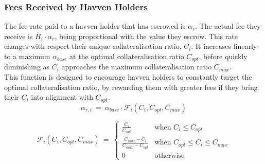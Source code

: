 \subsubsection{Fees Received by Havven Holders}

\noindent The fee rate paid to a havven holder that has escrowed is $\alpha_r$.
The actual fee they receive is $\check{H_i} \cdot \alpha_r$, being proportional with the value they escrow.
This rate changes with respect their unique collateralisation ratio, $C_i$. It increases linearly to a maximum $\alpha_{base}$ at the optimal collateralisation ratio $C_{opt}$, before quickly
diminishing as $C_i$ approaches the maximum collateralisation ratio $C_{max}$.  \\

\noindent This function is designed to encourage havven holders to constantly
target the optimal collateralisation ratio, by rewarding them with greater
fees if they bring their $C_i$ into alignment with $C_{opt}$.\\


\begin{equation}
\alpha_{r,i} \ = \ \alpha_{base} \cdot \mathcal{F}_{i}(C_{i}, C_{opt}, C_{max})  \label{eq:feesreceived}
\end{equation}

\begin{equation}
\mathcal{F}_{i}(C_{i}, C_{opt}, C_{max}) \ = \
\begin{cases}
 \frac{C_{i}}{C_{opt}} &\mbox{when } C_{i} \leq C_{opt} \\[1em]
 \frac{C_{max} - C_{i}}{C_{max} - C_{opt}} &\mbox{when } C_{opt} \leq C_{i} \leq C_{max} \\[1em]
 0 &\mbox{otherwise}
 \end{cases}
 \label{eq:7}
\end{equation}

\begin{center}
\end{center}

